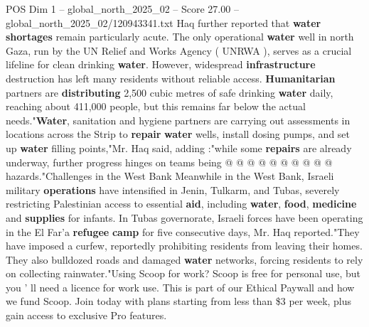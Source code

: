 \begin{textsample}{POS Dim 1 – global\_north\_2025\_02 – Score 27.00 – global\_north\_2025\_02/120943341.txt}
Haq further reported that \textbf{water} \textbf{shortages} remain particularly acute.
The only operational \textbf{water} well in north Gaza, run by the UN Relief and Works Agency ( UNRWA ), serves as a crucial lifeline for clean drinking \textbf{water}.
However, widespread \textbf{infrastructure} destruction has left many residents without reliable access. \textbf{Humanitarian} partners are \textbf{distributing} 2,500 cubic metres of safe drinking \textbf{water} daily, reaching about 411,000 people, but this remains far below the actual needs."\textbf{Water}, sanitation and hygiene partners are carrying out assessments in locations across the Strip to \textbf{repair} \textbf{water} wells, install dosing pumps, and set up \textbf{water} filling points,"Mr.
Haq said, adding :"while some \textbf{repairs} are already underway, further progress hinges on teams being @ @ @ @ @ @ @ @ @ @ hazards."Challenges in the West Bank Meanwhile in the West Bank, Israeli military \textbf{operations} have intensified in Jenin, Tulkarm, and Tubas, severely restricting Palestinian access to essential \textbf{aid}, including \textbf{water}, \textbf{food}, \textbf{medicine} and \textbf{supplies} for infants.
In Tubas governorate, Israeli forces have been operating in the El Far'a \textbf{refugee} \textbf{camp} for five consecutive days, Mr.
Haq reported."They have imposed a curfew, reportedly prohibiting residents from leaving their homes.
They also bulldozed roads and damaged \textbf{water} networks, forcing residents to rely on collecting rainwater."Using Scoop for work?
Scoop is free for personal use, but you ' ll need a licence for work use.
This is part of our Ethical Paywall and how we fund Scoop.
Join today with plans starting from less than \$3 per week, plus gain access to exclusive Pro features.

\end{textsample}
